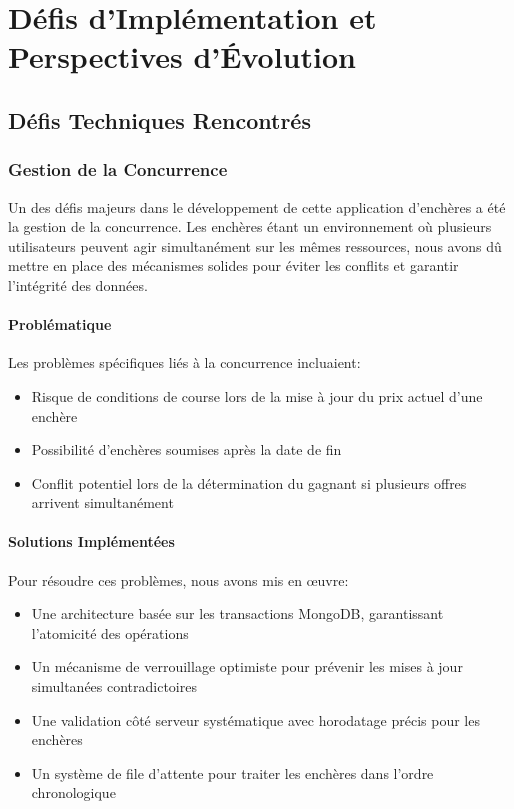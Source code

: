 \chapter{Défis d'Implémentation et Perspectives d'Évolution}

\section{Défis Techniques Rencontrés}

\subsection{Gestion de la Concurrence}
Un des défis majeurs dans le développement de cette application d'enchères a été la gestion de la concurrence. Les enchères étant un environnement où plusieurs utilisateurs peuvent agir simultanément sur les mêmes ressources, nous avons dû mettre en place des mécanismes solides pour éviter les conflits et garantir l'intégrité des données.

\subsubsection{Problématique}
Les problèmes spécifiques liés à la concurrence incluaient:
\begin{itemize}
    \item Risque de conditions de course lors de la mise à jour du prix actuel d'une enchère
    \item Possibilité d'enchères soumises après la date de fin
    \item Conflit potentiel lors de la détermination du gagnant si plusieurs offres arrivent simultanément
\end{itemize}

\subsubsection{Solutions Implémentées}
Pour résoudre ces problèmes, nous avons mis en œuvre:
\begin{itemize}
    \item Une architecture basée sur les transactions MongoDB, garantissant l'atomicité des opérations
    \item Un mécanisme de verrouillage optimiste pour prévenir les mises à jour simultanées contradictoires
    \item Une validation côté serveur systématique avec horodatage précis pour les enchères
    \item Un système de file d'attente pour traiter les enchères dans l'ordre chronologique
\end{itemize}


